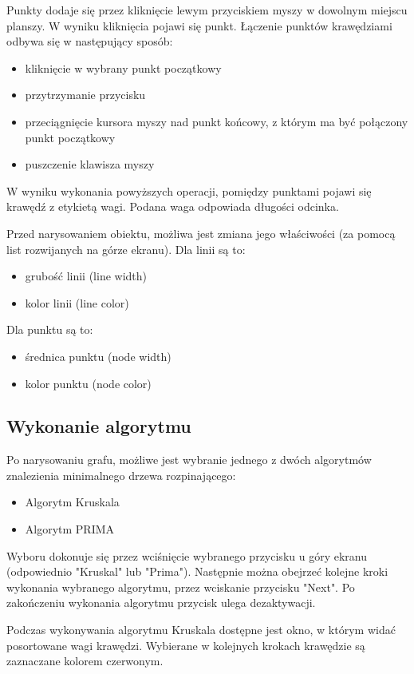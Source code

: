 \documentclass[paper=a4, fontsize=11pt]{scrartcl} %
\numberwithin{equation}{section} %
\numberwithin{figure}{section} %
\numberwithin{table}{section} %
\begin{document}
Punkty dodaje się przez kliknięcie lewym przyciskiem myszy w dowolnym miejscu planszy. W wyniku kliknięcia pojawi się punkt.
Łączenie punktów krawędziami odbywa się w następujący sposób:
\begin{itemize}
\item kliknięcie w wybrany punkt początkowy
\item przytrzymanie przycisku
\item przeciągnięcie kursora myszy nad punkt końcowy, z którym ma być połączony punkt początkowy
\item puszczenie klawisza myszy
\end{itemize}

W wyniku wykonania powyższych operacji, pomiędzy punktami pojawi się krawędź z etykietą wagi. Podana waga odpowiada długości odcinka.

Przed narysowaniem obiektu, możliwa jest zmiana jego właściwości (za pomocą list rozwijanych na górze ekranu).
Dla linii są to:
\begin{itemize}
\item grubość linii (line width)
\item kolor linii (line color)
\end{itemize}

Dla punktu są to:
\begin{itemize}
\item średnica punktu (node width)
\item kolor punktu (node color)
\end{itemize}

\subsection{Wykonanie algorytmu}

Po narysowaniu grafu, możliwe jest wybranie jednego z dwóch algorytmów znalezienia minimalnego drzewa rozpinającego:
\begin{itemize}
\item Algorytm Kruskala
\item Algorytm PRIMA
\end{itemize}

Wyboru dokonuje się przez wciśnięcie wybranego przycisku u góry ekranu (odpowiednio "Kruskal" lub "Prima"). Następnie można obejrzeć kolejne kroki wykonania wybranego algorytmu, przez wciskanie przycisku "Next". Po zakończeniu wykonania algorytmu przycisk ulega dezaktywacji.

Podczas wykonywania algorytmu Kruskala dostępne jest okno, w którym widać posortowane wagi krawędzi. Wybierane w kolejnych krokach krawędzie są zaznaczane kolorem czerwonym.
\end{document}
